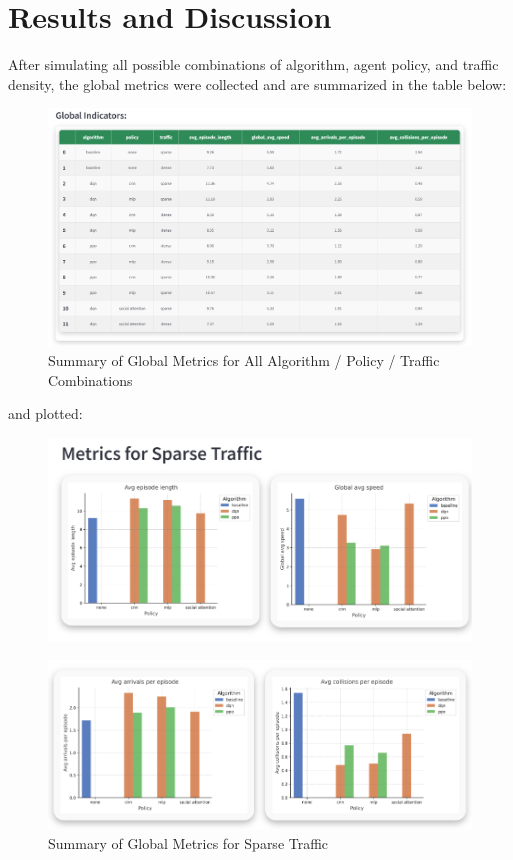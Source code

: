 \section{Results and Discussion}

After simulating all possible combinations of algorithm, agent policy, and traffic density, the global metrics were collected and are summarized in the table below:

\begin{figure}[H]
    \centering
    \includegraphics[height=0.42\textheight]{images/app_global_indicators.png} 
    \caption{Summary of Global Metrics for All Algorithm / Policy / Traffic Combinations}
\end{figure}

and plotted:

\begin{figure}[H]
    \centering
    \includegraphics[height=0.22\textheight]{images/app_global_plots_sparse1.png} 
\end{figure}

\begin{figure}[H]
    \centering
    \includegraphics[height=0.19\textheight]{images/app_global_plots_sparse2.png} 
    \caption{Summary of Global Metrics for Sparse Traffic}
\end{figure}

